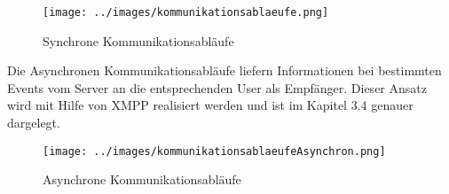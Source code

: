 \begin{figure}[H]
\texttt{[image: ../images/kommunikationsablaeufe.png]}
\caption{Synchrone Kommunikationsabläufe}
\label{kommunikationsablaeufe}
\end{figure}

Die Asynchronen Kommunikationsabläufe liefern Informationen bei bestimmten Events vom Server an die entsprechenden User als Empfänger. Dieser Ansatz wird mit Hilfe von XMPP realisiert werden und ist im Kapitel 3.4 genauer dargelegt.

\begin{figure}[H]
\texttt{[image: ../images/kommunikationsablaeufeAsynchron.png]}
\caption{Asynchrone Kommunikationsabläufe}
\label{kommunikationsablaeufeAsynchron}
\end{figure}
